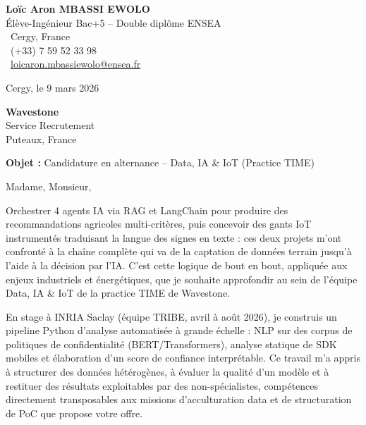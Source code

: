 \documentclass[a4paper,11pt]{article}
\begin{document}
\noindent
\begin{minipage}[t]{0.5\textwidth}
    \textbf{Loïc Aron MBASSI EWOLO}\\
    Élève-Ingénieur Bac+5 -- Double diplôme ENSEA\\[3pt]
    \faMapMarker\ Cergy, France\\
    \faPhone\ (+33) 7 59 52 33 98\\
    \faEnvelope\ \href{mailto:loicaron.mbassiewolo@ensea.fr}{loicaron.mbassiewolo@ensea.fr}
\end{minipage}
\hfill
\begin{minipage}[t]{0.4\textwidth}
    \raggedleft
    Cergy, le 9 mars 2026
\end{minipage}

\vspace{1.2cm}

\hfill
\begin{minipage}[t]{0.5\textwidth}
    \raggedleft
    \textbf{Wavestone}\\
    Service Recrutement\\
    Puteaux, France
\end{minipage}

\vspace{1cm}

\noindent\textbf{Objet :} Candidature en alternance -- Data, IA \& IoT (Practice TIME)

\vspace{0.8cm}

Madame, Monsieur,

Orchestrer 4 agents IA via RAG et LangChain pour produire des recommandations agricoles multi-critères, puis concevoir des gants IoT instrumentés traduisant la langue des signes en texte : ces deux projets m'ont confronté à la chaîne complète qui va de la captation de données terrain jusqu'à l'aide à la décision par l'IA. C'est cette logique de bout en bout, appliquée aux enjeux industriels et énergétiques, que je souhaite approfondir au sein de l'équipe Data, IA \& IoT de la practice TIME de Wavestone.

En stage à INRIA Saclay (équipe TRIBE, avril à août 2026), je construis un pipeline Python d'analyse automatisée à grande échelle : NLP sur des corpus de politiques de confidentialité (BERT/Transformers), analyse statique de SDK mobiles et élaboration d'un score de confiance interprétable. Ce travail m'a appris à structurer des données hétérogènes, à évaluer la qualité d'un modèle et à restituer des résultats exploitables par des non-spécialistes, compétences directement transposables aux missions d'acculturation data et de structuration de PoC que propose votre offre.
\end{document}
